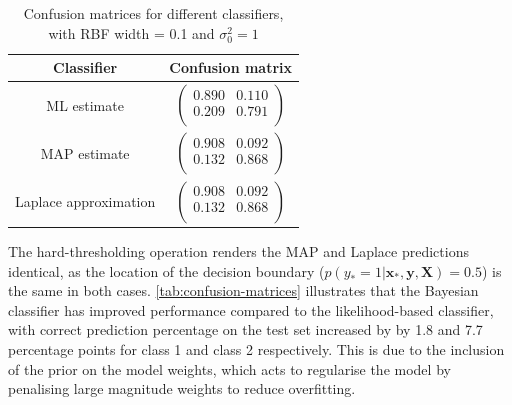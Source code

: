 \documentclass[a4paper]{article}
\begin{document}
    \begin{table}[h]
        \centering
        \begin{tabular}{c c}
            \textbf{Classifier} & \textbf{Confusion matrix} \\
            \hline
            ML estimate &
            $\begin{pmatrix}
                0.890 & 0.110 \\
                0.209 & 0.791 \\
            \end{pmatrix}$ \\
            MAP estimate &
            $\begin{pmatrix}
                0.908 & 0.092 \\
                0.132 & 0.868 \\
            \end{pmatrix}$ \\
            Laplace approximation &
            $\begin{pmatrix}
                0.908 & 0.092 \\
                0.132 & 0.868 \\
            \end{pmatrix}$ \\
        \end{tabular}
        \caption{Confusion matrices for different classifiers, with RBF width = 0.1 and $\sigma_0^2=1$}
        \label{tab:confusion-matrices}
    \end{table}

    The hard-thresholding operation renders the MAP and Laplace predictions identical, as the location of the decision boundary ($p(y_* = 1 | \bm{x}_*, \bm{y}, \bm{X}) = 0.5$) is the same in both cases.
    \autoref{tab:confusion-matrices} illustrates that the Bayesian classifier has improved performance compared to the likelihood-based classifier, with correct prediction percentage on the test set increased by by 1.8 and 7.7 percentage points for class 1 and class 2 respectively.
    This is due to the inclusion of the prior on the model weights, which acts to regularise the model by penalising large magnitude weights to reduce overfitting.
\end{document}
